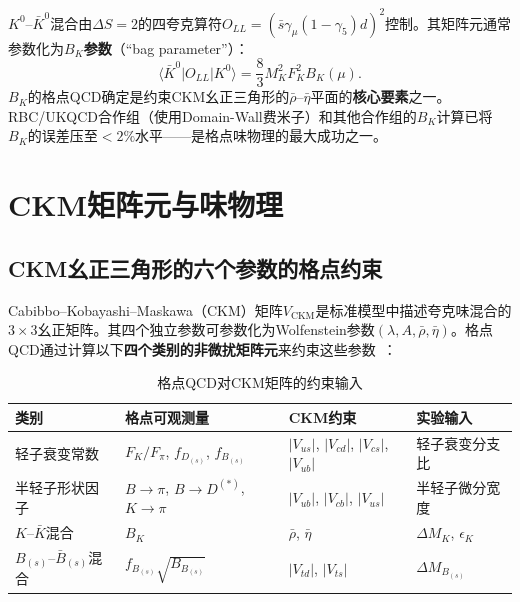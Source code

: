 \documentclass[12pt,a4paper]{ctexart}
\theoremstyle{definition}
\begin{document}
$K^0\text{--}\bar K^0$混合由$\Delta S=2$的四夸克算符$O_{LL} = (\bar s \gamma_\mu(1-\gamma_5) d)^2$控制。其矩阵元通常参数化为\textbf{$B_K$参数}（``bag parameter''）：
\begin{equation}
\langle \bar K^0 | O_{LL} | K^0 \rangle = \frac{8}{3} M_K^2 F_K^2 B_K(\mu).
\label{eq:BK_def}
\end{equation}
$B_K$的格点QCD确定是约束CKM幺正三角形的$\bar\rho\text{--}\bar\eta$平面的\textbf{核心要素}之一。RBC/UKQCD合作组（使用Domain-Wall费米子）和其他合作组的$B_K$计算已将$B_K$的误差压至$<2\%$水平——是格点味物理的最大成功之一。

\section{CKM矩阵元与味物理}

\subsection{CKM幺正三角形的六个参数的格点约束}

Cabibbo--Kobayashi--Maskawa（CKM）矩阵$V_{\text{CKM}}$是标准模型中描述夸克味混合的$3\times3$幺正矩阵。其四个独立参数可参数化为Wolfenstein参数$(\lambda, A, \bar\rho, \bar\eta)$。格点QCD通过计算以下\textbf{四个类别的非微扰矩阵元}来约束这些参数~\cite{GattringerLang2010}：

\begin{table}[H]
\centering
\caption{格点QCD对CKM矩阵的约束输入}
\label{tab:ckm_inputs}
\small
\begin{tabular}{p{2cm}p{4cm}p{2.5cm}p{4.5cm}}
\toprule
\textbf{类别} & \textbf{格点可观测量} & \textbf{CKM约束} & \textbf{实验输入} \\
\midrule
轻子衰变常数 & $F_K/F_\pi$, $f_{D_{(s)}}$, $f_{B_{(s)}}$ & $|V_{us}|$, $|V_{cd}|$, $|V_{cs}|$, $|V_{ub}|$ & 轻子衰变分支比 \\
半轻子形状因子 & $B\to\pi$, $B\to D^{(*)}$, $K\to\pi$ & $|V_{ub}|$, $|V_{cb}|$, $|V_{us}|$ & 半轻子微分宽度 \\
$K\text{--}\bar K$混合 & $B_K$ & $\bar\rho$, $\bar\eta$ & $\Delta M_K$, $\epsilon_K$ \\
$B_{(s)}\text{--}\bar B_{(s)}$混合 & $f_{B_{(s)}}\sqrt{B_{B_{(s)}}}$ & $|V_{td}|$, $|V_{ts}|$ & $\Delta M_{B_{(s)}}$ \\
\bottomrule
\end{tabular}
\end{table}
\end{document}
